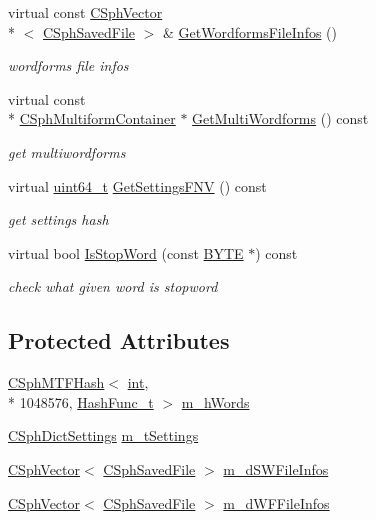 \begin{DoxyCompactItemize}
virtual const \hyperlink{classCSphVector}{C\-Sph\-Vector}\\*
$<$ \hyperlink{structCSphSavedFile}{C\-Sph\-Saved\-File} $>$ \& \hyperlink{classCSphStopwordBuilderDict_a9c99272dde1980d1ebfa46b40036be1e}{Get\-Wordforms\-File\-Infos} ()
\begin{DoxyCompactList}\small\item\em wordforms file infos \end{DoxyCompactList}\item 
virtual const \\*
\hyperlink{structCSphMultiformContainer}{C\-Sph\-Multiform\-Container} $\ast$ \hyperlink{classCSphStopwordBuilderDict_aeb61ceb2e9e5f67a4af70caa0c6f58b3}{Get\-Multi\-Wordforms} () const 
\begin{DoxyCompactList}\small\item\em get multiwordforms \end{DoxyCompactList}\item 
virtual \hyperlink{sphinxstd_8h_aaa5d1cd013383c889537491c3cfd9aad}{uint64\-\_\-t} \hyperlink{classCSphStopwordBuilderDict_a13b49efcb468d7977399bf36d25a9517}{Get\-Settings\-F\-N\-V} () const 
\begin{DoxyCompactList}\small\item\em get settings hash \end{DoxyCompactList}\item 
virtual bool \hyperlink{classCSphStopwordBuilderDict_aa5be3d6e84630cac5461f8b40a640f49}{Is\-Stop\-Word} (const \hyperlink{sphinxstd_8h_a4ae1dab0fb4b072a66584546209e7d58}{B\-Y\-T\-E} $\ast$) const 
\begin{DoxyCompactList}\small\item\em check what given word is stopword \end{DoxyCompactList}\end{DoxyCompactItemize}
\subsection*{Protected Attributes}
\begin{DoxyCompactItemize}
\item 
\hyperlink{classCSphMTFHash}{C\-Sph\-M\-T\-F\-Hash}$<$ \hyperlink{sphinxexpr_8cpp_a4a26e8f9cb8b736e0c4cbf4d16de985e}{int}, \\*
1048576, \hyperlink{structCSphStopwordBuilderDict_1_1HashFunc__t}{Hash\-Func\-\_\-t} $>$ \hyperlink{classCSphStopwordBuilderDict_a1d5a21402a4ac4cb1afe22804e6d0e7e}{m\-\_\-h\-Words}
\item 
\hyperlink{structCSphDictSettings}{C\-Sph\-Dict\-Settings} \hyperlink{classCSphStopwordBuilderDict_a786994cf2ce52279f14776fed031d90b}{m\-\_\-t\-Settings}
\item 
\hyperlink{classCSphVector}{C\-Sph\-Vector}$<$ \hyperlink{structCSphSavedFile}{C\-Sph\-Saved\-File} $>$ \hyperlink{classCSphStopwordBuilderDict_a547da75e21acb34489b5b044e6bbf178}{m\-\_\-d\-S\-W\-File\-Infos}
\item 
\hyperlink{classCSphVector}{C\-Sph\-Vector}$<$ \hyperlink{structCSphSavedFile}{C\-Sph\-Saved\-File} $>$ \hyperlink{classCSphStopwordBuilderDict_a2ea2e9e5e001bd12505d5af32ea8ccea}{m\-\_\-d\-W\-F\-File\-Infos}
\end{DoxyCompactItemize}
